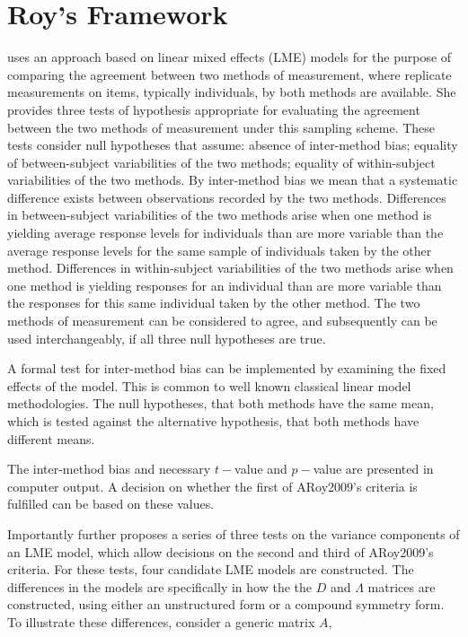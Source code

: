 \documentclass[12pt, a4paper]{report}
\theoremstyle{plain}
\theoremstyle{definition}
\theoremstyle{remark}
\begin{document}
\section{Roy's Framework}

\citet{ARoy2009} uses an approach based on linear mixed effects (LME) models for the purpose of comparing the agreement between two methods of measurement, where replicate measurements on items, typically individuals, by both methods are available. She provides three tests of hypothesis appropriate for evaluating the agreement between the two methods of measurement under this sampling scheme. These tests consider null hypotheses that assume: absence of inter-method bias; equality of between-subject variabilities of the two methods; equality of within-subject variabilities of the two methods. By inter-method bias we mean that a systematic difference exists between observations recorded by the two methods. Differences in between-subject variabilities of the two methods arise when one method is yielding average response levels for individuals than are more variable than the average response levels for the same sample of individuals taken by the other method.  Differences in within-subject variabilities of the two methods arise when one method is yielding responses for an individual than are more variable than the responses for this same individual taken by the other method. The two methods of measurement can be considered to agree, and subsequently can be used interchangeably, if all three null hypotheses are true.
	
A formal test for inter-method bias can be implemented by examining the fixed effects of the model. This is common to well known classical linear model methodologies. The null hypotheses, that both methods have the same mean, which is tested against the alternative hypothesis, that both methods have different means.
	
The inter-method bias and necessary $t-$value and $p-$value are presented in computer output. A decision on whether the first of ARoy2009's criteria is fulfilled can be based on these values.
	
Importantly \citet{ARoy2009} further proposes a series of three tests on the variance components of an LME model, which allow decisions on the second and third of ARoy2009's criteria. For these tests, four candidate LME models are constructed. The differences in the models are specifically in how the the $D$ and $\Lambda$ matrices are constructed, using either an unstructured form or a compound symmetry form. To illustrate these differences, consider a generic matrix $A$,
	
\end{document}
